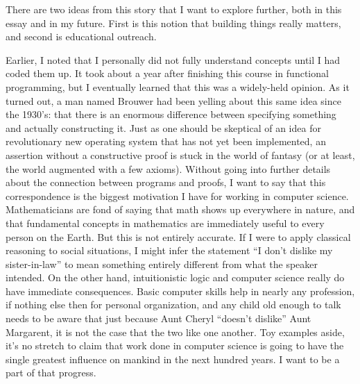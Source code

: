 \documentclass{article}
\begin{document}
There are two ideas from this story that I want to explore further, both in this essay and in my future.
First is this notion that building things really matters, and second is educational outreach.

Earlier, I noted that I personally did not fully understand concepts until I had coded them up.
It took about a year after finishing this course in functional programming, but I eventually learned that this was a widely-held opinion.
As it turned out, a man named Brouwer had been yelling about this same idea since the 1930's: that there is an enormous difference between specifying something and actually constructing it.
Just as one should be skeptical of an idea for revolutionary new operating system that has not yet been implemented, an assertion without a constructive proof is stuck in the world of fantasy (or at least, the world augmented with a few axioms).
Without going into further details about the connection between programs and proofs, I want to say that this correspondence is the biggest motivation I have for working in computer science.
Mathematicians are fond of saying that math shows up everywhere in nature, and that fundamental concepts in mathematics are immediately useful to every person on the Earth.
But this is not entirely accurate.
If I were to apply classical reasoning to social situations, I might infer the statement ``I don't dislike my sister-in-law'' to mean something entirely different from what the speaker intended.
On the other hand, intuitionistic logic and computer science really do have immediate consequences.
Basic computer skills help in nearly any profession, if nothing else then for personal organization, and any child old enough to talk needs to be aware that just because Aunt Cheryl ``doesn't dislike'' Aunt Margarent, it is not the case that the two like one another.
Toy examples aside, it's no stretch to claim that work done in computer science is going to have the single greatest influence on mankind in the next hundred years.
I want to be a part of that progress.

\vspace{0.5cm}
\end{document}
